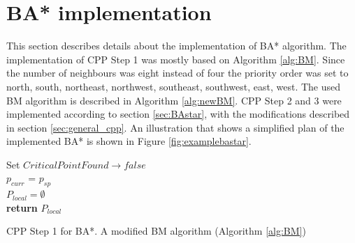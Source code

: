 \section{BA* implementation}
\label{sec:BA*impl}
This section describes details about the implementation of BA* algorithm. The implementation of CPP Step 1 was mostly based on Algorithm \ref{alg:BM}. Since the number of neighbours was eight instead of four the priority order was set to north, south, northeast, northwest, southeast, southwest, east, west. The used BM algorithm is described in Algorithm \ref{alg:newBM}. CPP Step 2 and 3 were implemented according to section \ref{sec:BAstar}, with the modifications described in section \ref{sec:general_cpp}. An illustration that shows a simplified plan of the implemented BA* is shown in Figure \ref{fig:examplebastar}.

\begin{algorithm}[H]
\SetAlgoLined
{}
\textup{Set $CriticalPointFound \rightarrow false$} \\
$p_{curr}$ = $p_{sp}$ \\
$P_{local} = \emptyset $\\
\textup{\textbf{return}} $P_{local}$

 \caption{CPP Step 1 for BA*. A modified BM algorithm (Algorithm \ref{alg:BM})}
 \label{alg:newBM}
\end{algorithm}


